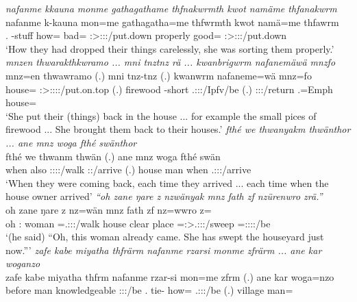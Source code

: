 \begin{exe}
	\emph{nafanme kkauna monme gathagathame thfnakwrmth kwot namäme thfanakwrm}\\
	\gll nafanme k-kauna mon=me gathagatha=me thfwrmth kwot namä=me thfawrm\\
	\Tnsg.\Poss{} \Redup-stuff how=\Ins{} bad=\Ins{} \Stpl:\Sbj>\Stpl:\Io:\Pst:\Dur/put.down properly good=\Ins{} \Stsg:\Sbj>\Stpl:\Obj:\Pst:\Dur/put.down\\
	\trans `How they had dropped their things carelessly, she was sorting them properly.'
	\emph{mnzen thwarakthkwramo ... mni tnztnz rä ... kwanbrigwrm nafanemäwä mnzfo}\\
	\gll mnz=en thwawramo (.) mni tnz-tnz  (.) kwanwrm nafaneme=wä mnz=fo\\
	house=\Loc{} \Stsg:\Sbj>\Stpl:\Io:\Pst:\Dur:\Andat/put.on.top (.) firewood \Redup-short \Tsg.\F:\Sbj:\Nonpast:/Ipfv/be (.) \Stsg:\Sbj:\Pst:\Dur/return \Tnsg.\Poss=Emph{} house=\All\\
	\trans `She put their (things) back in the house ... for example the small pices of firewood ... She brought them back to their houses.'
	\emph{fthé we thwanyakm thwänthor ... ane mnz woga fthé swänthor}\\
	\gll fthé we thwanm thwän (.) ane mnz woga fthé swän\\
	when also \Stpl:\Sbj:\Pst:\Dur:\Venit/walk \Stpl:\Sbj:\Iter\Venit/arrive (.) \Dem{} house man when \Tsg.\Masc:\Sbj:\Iter:\Venit/arrive\\
	\trans `When they were coming back, each time they arrived ... each time when the house owner arrived'
	\emph{``oh zane ŋare z nzwänyak mnz fath zf nzürenwro zrä.''}\\
	\gll oh zane ŋare z nz=wän mnz fath zf nz=wwro z=\\
	oh \Dem:\Prox{} woman \Iam{} \Immpst=\Tsg.\F:\Nonpast:\Ipfv:\Venit/walk house {clear place} \Imm{} \Immpst=\Stsg:\Sbj>\Tsg.\F:\Nonpast:\Ipfv:\Andat/sweep \Prox=\Tsg:\F:\Sbj:\Nonpast:\Ipfv/be\\
	\trans `(he said) ``Oh, this woman already came. She has swept the houseyard just now.'''
	\emph{zafe kabe miyatha thfrärm nafanme rzarsi monme zfrärm ... ane kar woganzo}\\
	\gll zafe kabe miyatha thfrm nafanme rzar-si mon=me zfrm (.) ane kar woga=nzo\\
	before man knowledgeable \Stpl:\Sbj:\Pst:\Dur/be \Tnsg.\Poss{} tie-\Nmlz{} how=\Ins{} \Tsg.\F:\Sbj:\Pst:\Dur/be (.) \Dem{} village man=\Only{}\\

\end{exe}
